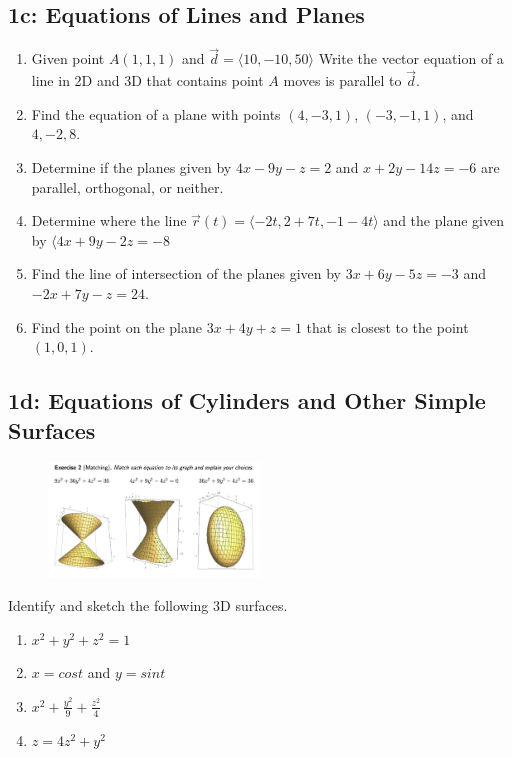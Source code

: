 \documentclass[11pt]{article}
\newenvironment{exercise}{
    \begin{mdframed}[style=problemstyle]\textcolor{black}{}
}{
    \end{mdframed}
}
\begin{document}
\subsection*{1c: Equations of Lines and Planes}
\begin{exercise}
    \begin{enumerate}[label={\alph*}]
        \item Given point $A(1,1,1)$ and $\vec{d} = \langle 10, -10, 50 \rangle$
            Write the vector equation of a line in 2D and 3D that contains point $A$ 
            moves is parallel to $\vec{d}$.
        \item Find the equation of a plane with points $(4, -3, 1)$, $(-3,-1, 1)$,
            and $4,-2, 8$.
        \item Determine if the planes given by $4x - 9y - z = 2$ and 
            $x + 2y -14z = -6$ are parallel, orthogonal, or neither.
        \item Determine where the line $\vec{r}(t) = \langle -2t, 2+7t, -1-4t \rangle$
            and the plane given by $\langle 4x + 9y - 2z = -8$ 
        \item Find the line of intersection of the planes given by 
            $3x + 6y - 5z = -3$ and $-2x + 7y - z = 24$.
        \item Find the point on the plane $3x + 4y + z = 1$ that is closest to the 
            point $(1, 0, 1)$.
    \end{enumerate}
\end{exercise}

\newpage
\subsection*{1d: Equations of Cylinders and Other Simple Surfaces}
\begin{figure}[!ht]
    \centering
    \includegraphics[width=0.5\textwidth]{images/match-practice.png}
\end{figure}
\begin{exercise}
    Identify and sketch the following 3D surfaces.
    \begin{enumerate}[label={\alph*}]
        \item $x^2 + y^2 + z^2 = 1$
        \item $x=cost$ and $y=sint$
        \item $x^2 +\frac{y^2}{9} + \frac{z^2}{4}$
        \item $z=4z^2+y^2$
    \end{enumerate}
\end{exercise}
\end{document}

